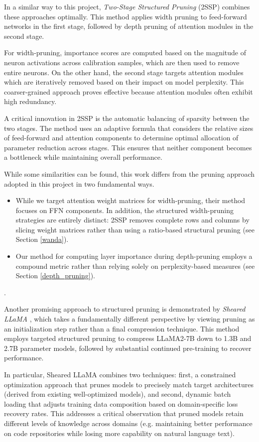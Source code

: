 In a similar way to this project, \textit{Two-Stage Structured Pruning} (2SSP) \cite{2ssp} combines these approaches optimally. This method applies width pruning to feed-forward networks in the first stage, followed by depth pruning of attention modules in the second stage.

For width-pruning, importance scores are computed based on the magnitude of neuron activations across calibration samples, which are then used to remove entire neurons. On the other hand, the second stage targets attention modules which are iteratively removed based on their impact on model perplexity. This coarser-grained approach proves effective because attention modules often exhibit high redundancy.

A critical innovation in 2SSP is the automatic balancing of sparsity between the two stages. The method uses an adaptive formula that considers the relative sizes of feed-forward and attention components to determine optimal allocation of parameter reduction across stages. This ensures that neither component becomes a bottleneck while maintaining overall performance.

While some similarities can be found, this work differs from the pruning approach adopted in this project in two fundamental ways.
\begin{itemize}
\item While we target attention weight matrices for width-pruning, their method focuses on FFN components. In addition, the structured width-pruning strategies are entirely distinct: 2SSP removes complete rows and columns by slicing weight matrices rather than using a ratio-based structural pruning (see Section \ref{wanda}).
\item Our method for computing layer importance during depth-pruning employs a compound metric rather than relying solely on perplexity-based measures (see Section \ref{depth_pruning}).
\end{itemize}.

Another promising approach to structured pruning is demonstrated by \textit{Sheared LLaMA} \cite{sheared_llama}, which takes a fundamentally different perspective by viewing pruning as an initialization step rather than a final compression technique. This method employs targeted structured pruning to compress LLaMA2-7B down to 1.3B and 2.7B parameter models, followed by substantial continued pre-training to recover performance.

In particular, Sheared LLaMA combines two techniques: first, a constrained optimization approach that prunes models to precisely match target architectures (derived from existing well-optimized models), and second, dynamic batch loading that adjusts training data composition based on domain-specific loss recovery rates. This addresses a critical observation that pruned models retain different levels of knowledge across domains (e.g. maintaining better performance on code repositories while losing more capability on natural language text).


